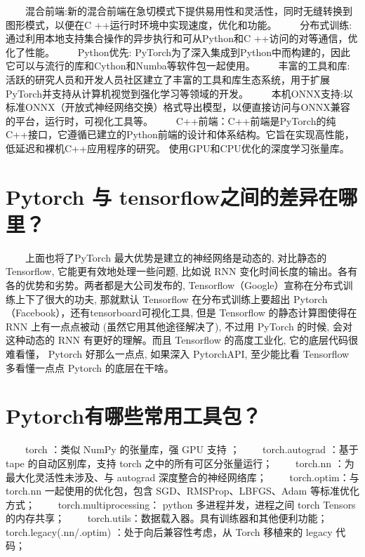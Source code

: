  混合前端:新的混合前端在急切模式下提供易用性和灵活性，同时无缝转换到图形模式，以便在C
++运行时环境中实现速度，优化和功能。
  分布式训练:通过利用本地支持集合操作的异步执行和可从Python和C
++访问的对等通信，优化了性能。   Python优先:
PyTorch为了深入集成到Python中而构建的，因此它可以与流行的库和Cython和Numba等软件包一起使用。
  丰富的工具和库:活跃的研究人员和开发人员社区建立了丰富的工具和库生态系统，用于扩展PyTorch并支持从计算机视觉到强化学习等领域的开发。
  本机ONNX支持:以标准ONNX（开放式神经网络交换）格式导出模型，以便直接访问与ONNX兼容的平台，运行时，可视化工具等。
  C++前端：C++前端是PyTorch的纯C++接口，它遵循已建立的Python前端的设计和体系结构。它旨在实现高性能，低延迟和裸机C++应用程序的研究。
使用GPU和CPU优化的深度学习张量库。

\section{ Pytorch 与 tensorflow之间的差异在哪里？}\label{pytorch-ux4e0e-tensorflow-ux4e4bux95f4ux7684ux5deeux5f02ux5728ux54eaux91cc}

  上面也将了PyTorch 最大优势是建立的神经网络是动态的, 对比静态的
Tensorflow, 它能更有效地处理一些问题, 比如说 RNN
变化时间长度的输出。各有各的优势和劣势。两者都是大公司发布的,
Tensorflow（Google）宣称在分布式训练上下了很大的功夫, 那就默认
Tensorflow 在分布式训练上要超出
Pytorch（Facebook），还有tensorboard可视化工具, 但是 Tensorflow
的静态计算图使得在 RNN 上有一点点被动 (虽然它用其他途径解决了), 不过用
PyTorch 的时候, 会对这种动态的 RNN 有更好的理解。而且 Tensorflow
的高度工业化, 它的底层代码很难看懂， Pytorch 好那么一点点, 如果深入
PytorchAPI, 至少能比看 Tensorflow 多看懂一点点 Pytorch 的底层在干啥。

\section{Pytorch有哪些常用工具包？}\label{pytorchux6709ux54eaux4e9bux5e38ux7528ux5de5ux5177ux5305}

  torch ：类似 NumPy 的张量库，强 GPU 支持 ；   torch.autograd ：基于
tape 的自动区别库，支持 torch 之中的所有可区分张量运行；   torch.nn
：为最大化灵活性未涉及、与 autograd 深度整合的神经网络库；
  torch.optim：与 torch.nn 一起使用的优化包，包含
SGD、RMSProp、LBFGS、Adam 等标准优化方式；   torch.multiprocessing：
python 多进程并发，进程之间 torch Tensors 的内存共享；
  torch.utils：数据载入器。具有训练器和其他便利功能；
  torch.legacy(.nn/.optim) ：处于向后兼容性考虑，从 Torch 移植来的
legacy 代码；

